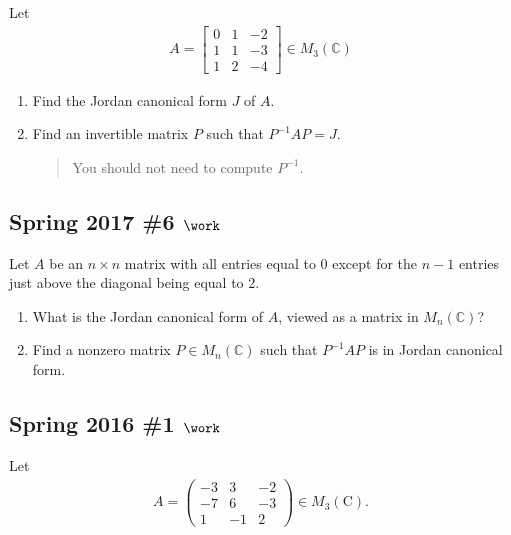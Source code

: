 Let
\begin{align*}
A=\left[\begin{array}{lll}{0} & {1} & {-2} \\ {1} & {1} & {-3} \\ {1} & {2} & {-4}\end{array}\right] \in M_{3}(\mathbb{C})
\end{align*}

\begin{enumerate}
\def\labelenumi{\alph{enumi}.}
\item
  Find the Jordan canonical form \(J\) of \(A\).
\item
  Find an invertible matrix \(P\) such that \(P^{-1}AP = J\).

  \begin{quote}
  You should not need to compute \(P^{-1}\).
  \end{quote}
\end{enumerate}

\hypertarget{spring-2017-6-work}{%
\subsection{\texorpdfstring{Spring 2017 \#6
\(\work\)}{Spring 2017 \#6 \textbackslash work}}\label{spring-2017-6-work}}

Let \(A\) be an \(n\times n\) matrix with all entries equal to \(0\)
except for the \(n-1\) entries just above the diagonal being equal to 2.

\begin{enumerate}
\def\labelenumi{\alph{enumi}.}
\item
  What is the Jordan canonical form of \(A\), viewed as a matrix in
  \(M_n({\mathbb{C}})\)?
\item
  Find a nonzero matrix \(P\in M_n({\mathbb{C}})\) such that
  \(P^{-1}A P\) is in Jordan canonical form.
\end{enumerate}

\hypertarget{spring-2016-1-work}{%
\subsection{\texorpdfstring{Spring 2016 \#1
\(\work\)}{Spring 2016 \#1 \textbackslash work}}\label{spring-2016-1-work}}

Let
\begin{align*}
A=\left(\begin{array}{ccc}
-3 & 3 & -2 \\
-7 & 6 & -3 \\
1 & -1 & 2
\end{array}\right) \in M_{3}(\mathrm{C})
.\end{align*}

